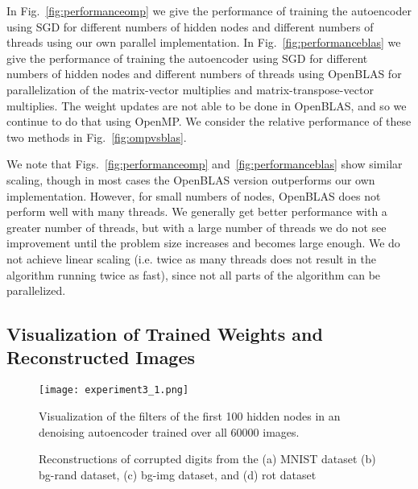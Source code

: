 In  Fig.~\ref{fig:performanceomp} we give the performance of training the autoencoder using SGD for different numbers of hidden nodes and different numbers of threads using our own parallel implementation.
In  Fig.~\ref{fig:performanceblas} we give the performance of training the autoencoder using SGD for different numbers of hidden nodes and different numbers of threads using OpenBLAS for parallelization of the matrix-vector multiplies and matrix-transpose-vector multiplies. The weight updates are not able to be done in OpenBLAS, and so we continue to do that using OpenMP. We consider the relative performance of these two methods in Fig.~\ref{fig:ompvsblas}.

We note that Figs.~\ref{fig:performanceomp} and~\ref{fig:performanceblas} show similar scaling, though in most cases the OpenBLAS version outperforms our own implementation. However, for small numbers of nodes, OpenBLAS does not perform well with many threads.
We generally get better performance with a greater number of threads, but with a large number of threads we do not see improvement until the problem size increases and becomes large enough. We do not achieve linear scaling (i.e. twice as many threads does not result in the algorithm running twice as fast), since not all parts of the algorithm can be parallelized. 

\subsection{Visualization of Trained Weights and Reconstructed Images}

\begin{figure}[h] \centering
  \texttt{[image: experiment3\_1.png]}
  \caption{Visualization of the filters of the first 100 hidden nodes in an
  denoising autoencoder trained over all 60000 images.}
  \label{fig:experiment3_1}
\end{figure}

\begin{figure*}
  \centering
  \hspace{5mm}
  \caption{Reconstructions of corrupted digits from the (a) MNIST dataset (b) bg-rand dataset, (c) bg-img dataset, and (d) rot dataset}
  \label{fig:reconstruct}
\end{figure*}

